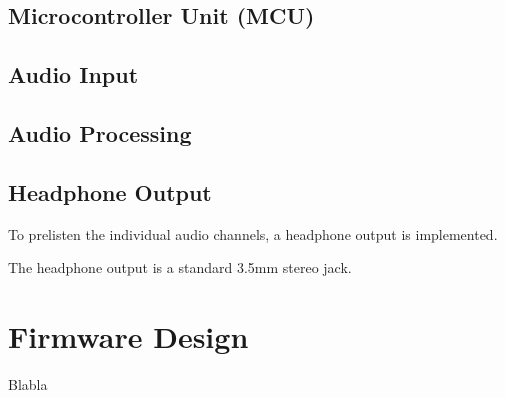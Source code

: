 \subsection{Microcontroller Unit (MCU)}



\subsection{Audio Input}

\subsection{Audio Processing}

\subsection{Headphone Output}

To prelisten the individual audio channels, a headphone output is implemented.

The headphone output is a standard 3.5mm stereo jack.



\newpage
\section{Firmware Design}
Blabla



